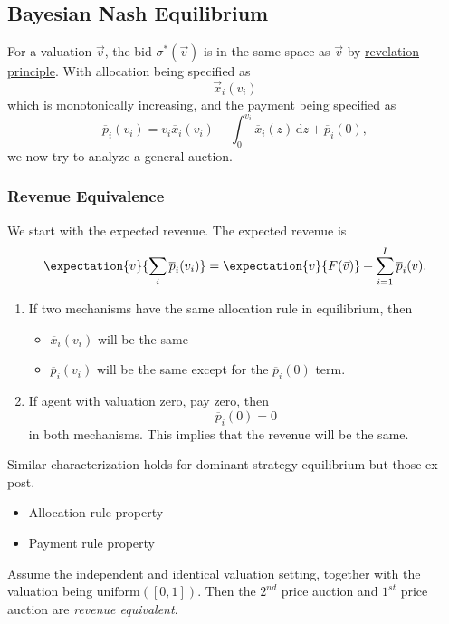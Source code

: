 \subsection{Bayesian Nash Equilibrium}
\begin{prev}
	For a valuation \(\vec{v}\), the bid \(\sigma^{*}(\vec{v})\) is in the same space as \(\vec{v}\) by \hyperref[Revelation-Principle]{revelation principle}.
	With allocation being specified as
	\[
		\vec{x}_{i}(v_{i})
	\]
	which is monotonically increasing, and the payment being specified as
	\[
		\overline{p}_{i}(v_{i}) = v_{i}\overline{x}_{i}(v_{i}) - \int_0^{v_{i}}\overline{x}_{i}(z)\,\mathrm{d}z + \overline{p}_{i}(0),
	\]
	we now try to analyze a general auction.
\end{prev}

\subsubsection{Revenue Equivalence}
We start with the expected revenue. The expected revenue is
\[
	\expectation{v}{\sum\limits_{i}\overline{p}_{i}(v_{i}) } = \expectation{v}{F(\vec{v})} + \sum\limits_{i=1}^{I} \overline{p}_{i}(v).
\]
\begin{enumerate}
	\item If two mechanisms have the same allocation rule in equilibrium, then
	      \begin{itemize}
		      \item \(\overline{x}_{i}(v_{i})\) will be the same
		      \item \(\overline{p}_{i}(v_{i})\) will be the same except for the \(\overline{p}_{i}(0)\) term.
	      \end{itemize}
	\item If agent with valuation zero, pay zero, then
	      \[
		      \overline{p}_{i}(0) = 0
	      \]
	      in both mechanisms. This implies that the revenue will be the same.
\end{enumerate}

\begin{note}
	Similar characterization holds for dominant strategy equilibrium but those ex-post.
	\begin{itemize}
		\item Allocation rule property
		\item Payment rule property
	\end{itemize}
\end{note}

Assume the independent and identical valuation setting, together with the valuation being \(\mathrm{uniform}([0,1])\). Then the \(2^{nd}\) price auction
and \(1^{st}\) price auction are \emph{revenue equivalent}.

